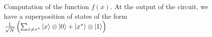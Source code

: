 \begin{figure}
\centering



\caption{Computation of the function $f\left(x\right)$. At the output of the circuit, we have a superposition of states of the form 
$\frac{1}{\sqrt{N}}\left(
 \sum_{x \ne x^{\ast}} \ket{x}\otimes\ket{0}
+ \left|x^{\ast}\right>\otimes\ket{1}
\right)$}
\label{figQuantCompGrover1}
\end{figure}